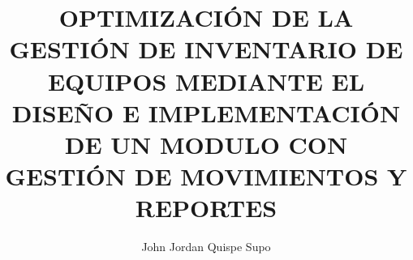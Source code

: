 \documentclass[stu, 12pt, letterpaper, donotrepeattitle, floatsintext, natbib]{apa7}
\title{OPTIMIZACIÓN DE LA GESTIÓN DE INVENTARIO DE EQUIPOS MEDIANTE EL DISEÑO E IMPLEMENTACIÓN DE UN MODULO CON GESTIÓN DE MOVIMIENTOS Y REPORTES}
\author{John Jordan Quispe Supo}
\begin{document}
\maketitle
\renewcommand\refname{\textbf{Bibliografía}}
\renewcommand\contentsname{Índice}
\tableofcontents
\setcounter{tocdepth}{2}
\newpage
\renewcommand\listfigurename{Índice de Figuras}
\listoffigures
\newpage
\renewcommand\listtablename{Índice de Tablas}
\listoftables
\newpage
\renewcommand\lstlistlistingname{Índice de Códigos}
\renewcommand\lstlistingname{Código}
\lstlistoflistings\newpage




\end{document}
